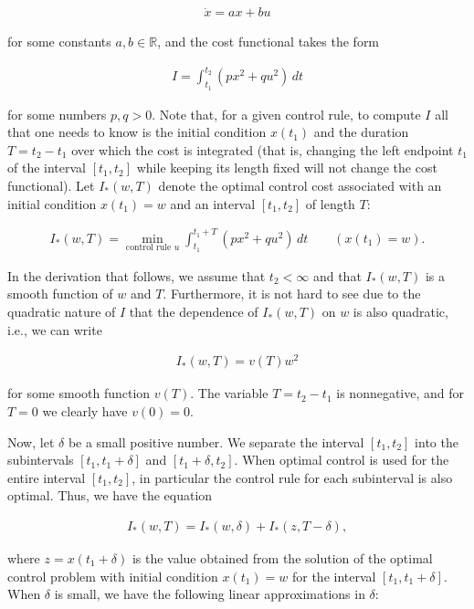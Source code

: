 \documentclass[11pt]{report}
\theoremstyle{plain}
\theoremstyle{definition}
\begin{document}
\begin{align*}
\dot{x} = ax+bu
\end{align*}

for some constants $a,b\in\mathbb{R}$, and the cost
functional takes the form

\begin{align*}
I = \int_{t_1}^{t_2} (px^2+qu^2)\,dt
\end{align*}

for some numbers $p,q>0$. Note that, for a given
control rule, to compute $I$ all that one needs to
know is the initial condition $x(t_1)$ and the
duration $T=t_2-t_1$ over which the cost is
integrated (that is, changing the left endpoint $t_1$
of the interval $[t_1,t_2]$ while keeping its length
fixed will not change the cost functional). Let
$I_*(w,T)$ denote the optimal control cost associated
with an initial condition $x(t_1)=w$ and an interval
$[t_1,t_2]$ of length $T$:

\begin{align*}
I_*(w,T) = \min_{\textrm{control rule $u$}} \int_{t_1}^{t_1+T} (p x^2+qu^2)\,dt
 \qquad (x(t_1)=w).
\end{align*}

In the derivation that follows, we assume that
$t_2<\infty$ and that $I_*(w,T)$ is a smooth function
of $w$ and $T$. Furthermore, it is not hard to see
due to the quadratic nature of $I$ that the
dependence of $I_*(w,T)$ on $w$ is also quadratic,
i.e., we can write

\begin{align*}
I_*(w,T) = v(T) w^2
\end{align*}

for some smooth function $v(T)$. The variable
$T=t_2-t_1$ is nonnegative, and for $T=0$ we clearly
have $v(0)=0$.

Now, let $\delta$ be a small positive number. We
separate the interval $[t_1,t_2]$ into the
subintervals $[t_1,t_1+\delta]$ and
$[t_1+\delta,t_2]$. When optimal control is used for
the entire interval $[t_1,t_2]$, in particular the
control rule for each subinterval is also optimal.
Thus, we have the equation

\begin{equation*} \tag{48}\label{eq:lqp-subintervals}
\begin{split}
I_*(w,T) = I_*(w,\delta) + I_*(z,T-\delta),
\end{split}
\end{equation*}

where $z=x(t_1+\delta)$ is the value obtained from
the solution of the optimal control problem with
initial condition $x(t_1)=w$ for the interval
$[t_1,t_1+\delta]$. When $\delta$ is small, we have
the following linear approximations in $\delta$:
\end{document}
